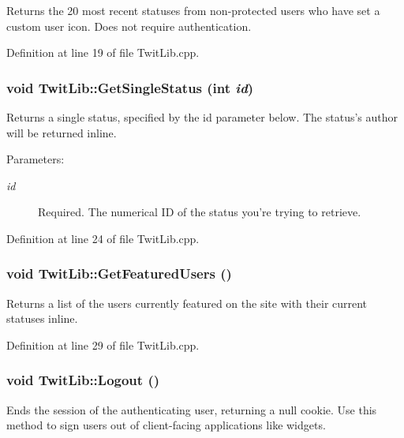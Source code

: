 Returns the 20 most recent statuses from non-protected users who have set a custom user icon. Does not require authentication. 

Definition at line 19 of file TwitLib.cpp.\hypertarget{classTwitLib_aecdd7da5a39a8687056c3da36889f55}{
\subsubsection{\setlength{\rightskip}{0pt plus 5cm}void TwitLib::GetSingleStatus (int {\em id})}}
\label{classTwitLib_aecdd7da5a39a8687056c3da36889f55}


Returns a single status, specified by the id parameter below. The status's author will be returned inline. \begin{Desc}
\item[Parameters:]
\begin{description}
\item[{\em id}]Required. The numerical ID of the status you're trying to retrieve. \end{description}
\end{Desc}


Definition at line 24 of file TwitLib.cpp.\hypertarget{classTwitLib_76cd55d78f2b060a9e7643a2d549f6ce}{
\subsubsection{\setlength{\rightskip}{0pt plus 5cm}void TwitLib::GetFeaturedUsers ()}}
\label{classTwitLib_76cd55d78f2b060a9e7643a2d549f6ce}


Returns a list of the users currently featured on the site with their current statuses inline. 

Definition at line 29 of file TwitLib.cpp.\hypertarget{classTwitLib_f302e755368a303331d8f6f2d84c9770}{
\subsubsection{\setlength{\rightskip}{0pt plus 5cm}void TwitLib::Logout ()}}
\label{classTwitLib_f302e755368a303331d8f6f2d84c9770}


Ends the session of the authenticating user, returning a null cookie. Use this method to sign users out of client-facing applications like widgets. 

